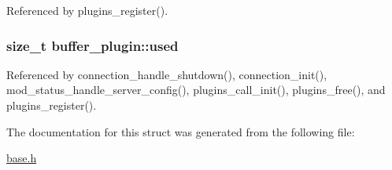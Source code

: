 Referenced by plugins\-\_\-register().

\hypertarget{structbuffer__plugin_ae1edd3748c47e1154f580d97f8a956b0}{
\subsubsection[{used}]{\setlength{\rightskip}{0pt plus 5cm}size\-\_\-t buffer\-\_\-plugin\-::used}}\label{structbuffer__plugin_ae1edd3748c47e1154f580d97f8a956b0}


Referenced by connection\-\_\-handle\-\_\-shutdown(), connection\-\_\-init(), mod\-\_\-status\-\_\-handle\-\_\-server\-\_\-config(), plugins\-\_\-call\-\_\-init(), plugins\-\_\-free(), and plugins\-\_\-register().



The documentation for this struct was generated from the following file\-:\begin{DoxyCompactItemize}
\item 
\hyperlink{base_8h}{base.\-h}\end{DoxyCompactItemize}
